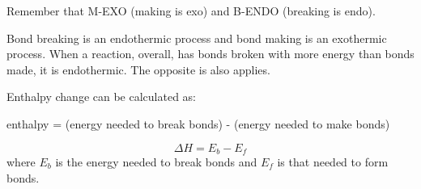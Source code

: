 Remember that M-EXO (making is exo) and B-ENDO (breaking is endo).

Bond breaking is an endothermic process and bond making is an exothermic process. When a reaction,
overall, has bonds broken with more energy than bonds made, it is endothermic. The opposite is
also applies.

Enthalpy change can be calculated as:
\begin{center}
	enthalpy = (energy needed to break bonds) - (energy needed to
	make bonds)
\end{center}
\[\Delta H = E_b - E_f\]
where $E_b$ is the energy needed to break bonds and $E_f$ is that needed to form bonds.
